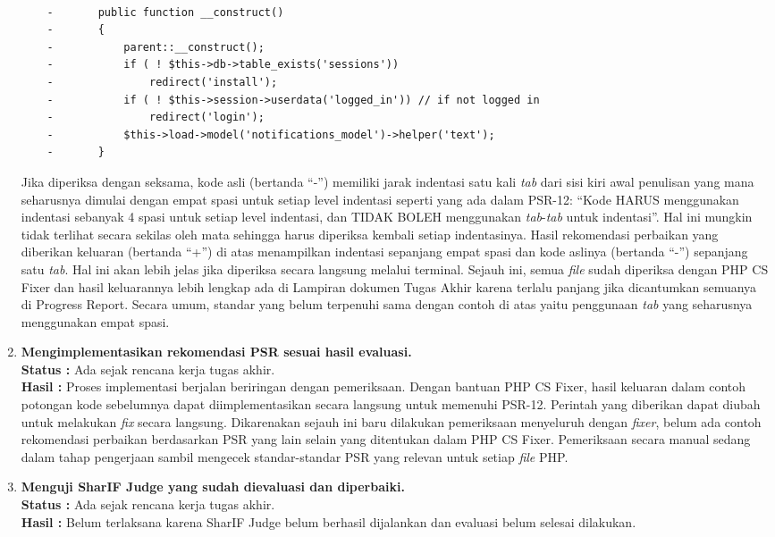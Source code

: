 \documentclass[a4paper,twoside]{article}
\begin{document}
\begin{enumerate}
\begin{lstlisting}[frame=single,language=diff]
		
	-		public function __construct()
	-		{
	-			parent::__construct();
	-			if ( ! $this->db->table_exists('sessions'))
	-				redirect('install');
	-			if ( ! $this->session->userdata('logged_in')) // if not logged in
	-				redirect('login');
	-			$this->load->model('notifications_model')->helper('text');
	-		}
\end{lstlisting}
			Jika diperiksa dengan seksama, kode asli (bertanda ``-'') memiliki jarak indentasi satu kali \textit{tab} dari sisi kiri awal penulisan yang mana seharusnya dimulai dengan empat spasi untuk setiap level indentasi seperti yang ada dalam PSR-12: ``Kode HARUS menggunakan indentasi sebanyak 4 spasi untuk setiap level indentasi, dan TIDAK BOLEH menggunakan \textit{tab}-\textit{tab} untuk indentasi''. Hal ini mungkin tidak terlihat secara sekilas oleh mata sehingga harus diperiksa kembali setiap indentasinya. Hasil rekomendasi perbaikan yang diberikan keluaran (bertanda ``+'') di atas menampilkan indentasi sepanjang empat spasi dan kode aslinya (bertanda ``-'') sepanjang satu \textit{tab}. Hal ini akan lebih jelas jika diperiksa secara langsung melalui terminal. 
			Sejauh ini, semua \textit{file} sudah diperiksa dengan PHP CS Fixer dan hasil keluarannya lebih lengkap ada di Lampiran dokumen Tugas Akhir karena terlalu panjang jika dicantumkan semuanya di Progress Report. Secara umum, standar yang belum terpenuhi sama dengan contoh di atas yaitu penggunaan \textit{tab} yang seharusnya menggunakan empat spasi. 			
			\item \textbf{Mengimplementasikan rekomendasi PSR sesuai hasil evaluasi.}\\
			{\bf Status :} Ada sejak rencana kerja tugas akhir.\\
			{\bf Hasil :} Proses implementasi berjalan beriringan dengan pemeriksaan. Dengan bantuan PHP CS Fixer, hasil keluaran dalam contoh potongan kode sebelumnya dapat diimplementasikan secara langsung untuk memenuhi PSR-12. Perintah yang diberikan dapat diubah untuk melakukan \textit{fix} secara langsung. Dikarenakan sejauh ini baru dilakukan pemeriksaan menyeluruh dengan \textit{fixer}, belum ada contoh rekomendasi perbaikan berdasarkan PSR yang lain selain yang ditentukan dalam PHP CS Fixer. Pemeriksaan secara manual sedang dalam tahap pengerjaan sambil mengecek standar-standar PSR yang relevan untuk setiap \textit{file} PHP. 
			
			\item \textbf{Menguji SharIF Judge yang sudah dievaluasi dan diperbaiki.}\\
			{\bf Status :} Ada sejak rencana kerja tugas akhir.\\
			{\bf Hasil :} Belum terlaksana karena SharIF Judge belum berhasil dijalankan dan evaluasi belum selesai dilakukan. 
			

\end{enumerate}
\end{document}
